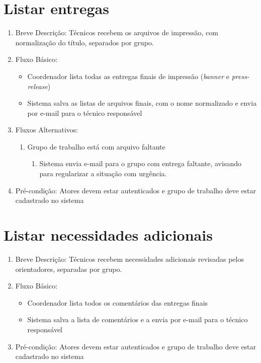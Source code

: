\section{Listar entregas}
\begin{enumerate}
    \item Breve Descrição: Técnicos recebem os arquivos de impressão, com normalização do título, separados por grupo.
    \item Fluxo Básico:
    \begin{itemize}
        \item Coordenador lista todas as entregas finais de impressão (\textit{banner} e \textit{press-release})
        \item Sistema salva as listas de arquivos finais, com o nome normalizado e envia por e-mail para o técnico responsável
    \end{itemize}
    \item Fluxos Alternativos:
    \begin{enumerate}
        \item Grupo de trabalho está com arquivo faltante
        \begin{enumerate}
            \item Sistema envia e-mail para o grupo com entrega faltante, avisando para regularizar a situação com urgência.
        \end{enumerate}
    \end{enumerate}
    \item Pré-condição: Atores devem estar autenticados e grupo de trabalho deve estar cadastrado no sistema
\end{enumerate}

\section{Listar necessidades adicionais}
\begin{enumerate}
    \item Breve Descrição: Técnicos recebem necessidades adicionais revisadas pelos orientadores, separadas por grupo.
    \item Fluxo Básico:
    \begin{itemize}
        \item Coordenador lista todos os comentários das entregas finais
        \item Sistema salva a lista de comentários e a envia por e-mail para o técnico responsável
    \end{itemize}
    \item Pré-condição: Atores devem estar autenticados e grupo de trabalho deve estar cadastrado no sistema
\end{enumerate}

